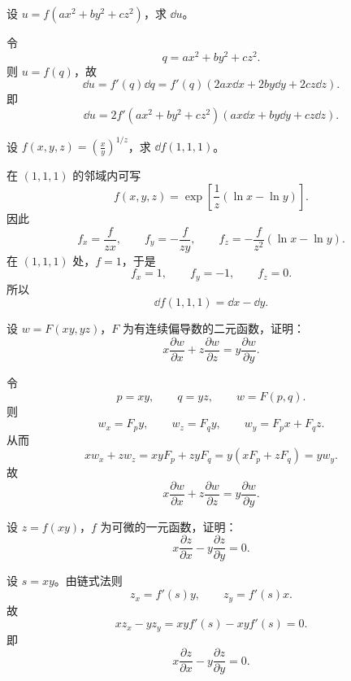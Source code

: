 \begin{xexercise}[5]
设 $u=f(ax^2+by^2+cz^2)$，求 $\dd u$。
\end{xexercise}
\begin{xsolution}
令
\[
  q=ax^2+by^2+cz^2.
\]
则 $u=f(q)$，故
\[
  \dd u=f'(q)\dd q
  =f'(q)(2ax\dd x+2by\dd y+2cz\dd z).
\]
即
\[
  \boxed{\dd u
  =2f'(ax^2+by^2+cz^2)
  (ax\dd x+by\dd y+cz\dd z)}.
\]
\end{xsolution}


\begin{xexercise}[6]
设 $f(x,y,z)=\left(\frac xy\right)^{1/z}$，求 $\dd f(1,1,1)$。
\end{xexercise}
\begin{xsolution}
在 $(1,1,1)$ 的邻域内可写
\[
  f(x,y,z)=\exp\left[\frac1z(\ln x-\ln y)\right].
\]
因此
\[
  f_x=\frac{f}{zx},
  \qquad
  f_y=-\frac{f}{zy},
  \qquad
  f_z=-\frac{f}{z^2}(\ln x-\ln y).
\]
在 $(1,1,1)$ 处，$f=1$，于是
\[
  f_x=1,
  \qquad f_y=-1,
  \qquad f_z=0.
\]
所以
\[
  \boxed{\dd f(1,1,1)=\dd x-\dd y}.
\]
\end{xsolution}


\begin{xexercise}[7]
设 $w=F(xy,yz)$，$F$ 为有连续偏导数的二元函数，证明：
  \[
    x\frac{\partial w}{\partial x}+z\frac{\partial w}{\partial z}=y\frac{\partial w}{\partial y}.
  \]
\end{xexercise}
\begin{xsolution}
令
\[
  p=xy,
  \qquad q=yz,
  \qquad w=F(p,q).
\]
则
\[
  w_x=F_p y,
  \qquad
  w_z=F_q y,
  \qquad
  w_y=F_p x+F_q z.
\]
从而
\[
  xw_x+zw_z
  =xyF_p+zyF_q
  =y(xF_p+zF_q)
  =yw_y.
\]
故
\[
  \boxed{x\frac{\partial w}{\partial x}
  +z\frac{\partial w}{\partial z}
  =y\frac{\partial w}{\partial y}}.
\]
\end{xsolution}


\begin{xexercise}[8]
设 $z=f(xy)$，$f$ 为可微的一元函数，证明：
  \[
    x\frac{\partial z}{\partial x}-y\frac{\partial z}{\partial y}=0.
  \]
\end{xexercise}
\begin{xsolution}
设 $s=xy$。由链式法则
\[
  z_x=f'(s)y,
  \qquad
  z_y=f'(s)x.
\]
故
\[
  xz_x-yz_y
  =xyf'(s)-xyf'(s)=0.
\]
即
\[
  \boxed{x\frac{\partial z}{\partial x}
  -y\frac{\partial z}{\partial y}=0}.
\]
\end{xsolution}


